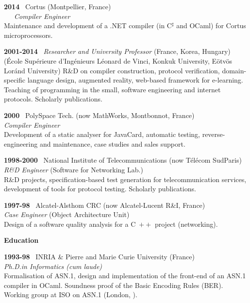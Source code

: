 \documentclass[a4paper,11pt]{article}
\newcommand{\cpp}{\mbox{C \hspace*{-2.5mm} \raise 0.7mm \hbox{${\scriptscriptstyle ++}$}}}
\begin{document}
\noindent\textbf{2014} \ \textsf{Cortus} (Montpellier,
France)\\ \ \ \ \emph{Compiler Engineer}\\ Maintenance and development
of a .NET compiler (in C$^\sharp$ and OCaml) for \textsf{Cortus}
microprocessors.

\bigskip

\noindent\textbf{2001-2014} \ \textsf{\emph{Researcher and University
  Professor}} (France, Korea, Hungary)\\ (\textsf{\'Ecole Sup\'erieure
  d'Ing\'enieurs L\'eonard de Vinci}, \textsf{Konkuk University},
\textsf{E\"otv\"os Lor\'and University}) R\&D on compiler
construction, protocol verification, domain\hyp{}specific language
design, augmented reality, web-based framework for
e-learning. Teaching of programming in the small, software engineering
and internet protocols. Scholarly publications.

\bigskip

\noindent\textbf{2000} \ \textsf{PolySpace Tech.\@} (now MathWorks,
Montbonnot, France)\\ \emph{Compiler Engineer}\\ Development of a static
analyser for JavaCard, automatic testing, reverse\hyp{}engineering and
maintenance, case studies and sales support.

\bigskip

\noindent\textbf{1998-2000} \ \textsf{National Institute of
  Telecommunications} (now T\'el\'ecom SudParis)\\ \emph{R\&D
  Engineer} (Software for Networking Lab.)\\ R\&D projects,
specification-based test generation for telecommunication services,
development of tools for protocol testing. Scholarly publications.

\bigskip

\noindent\textbf{1997-98} \ \textsf{Alcatel-Alsthom CRC} (now
Alcatel-Lucent R\&I, France)\\ \emph{Case Engineer} (Object
Architecture Unit)\\ Design of a software quality analysis for a
\cpp{} project (networking).

\bigskip
\noindent\textbf{\large Education}
\bigskip

\noindent\textbf{1993-98} \ \textsf{INRIA \& Pierre and Marie Curie
  University} (France)\\ \emph{Ph.D.\@ in Informatics (cum
laude)}\\ Formalisation of ASN.1, design and implementation of the
front-end of an ASN.1 compiler in OCaml. Soundness proof of the Basic
Encoding Rules (BER). Working group at ISO on ASN.1 (London,
).
\end{document}
